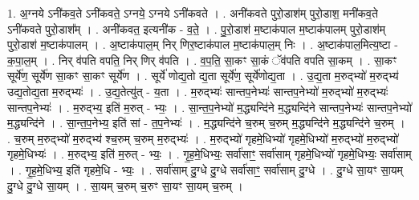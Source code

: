 \documentclass[17pt]{extarticle}
\begin{document}
1. अ॒ग्नये ऽनी॑कव॒ते ऽनी॑कवते॒ ऽग्नये॒ ऽग्नये ऽनी॑कवते । . अनी॑कवते पुरो॒डाश॑म् पुरो॒डाश॒ मनी॑कव॒ते ऽनी॑कवते पुरो॒डाश᳚म् । . अनी॑कवत॒ इत्यनी॑क - व॒ते॒ । . पु॒रो॒डाश॑ म॒ष्टाक॑पाल म॒ष्टाक॑पालम् पुरो॒डाश॑म् पुरो॒डाश॑ म॒ष्टाक॑पालम् । . अ॒ष्टाक॑पाल॒म् निर् णिर॒ष्टाक॑पाल म॒ष्टाक॑पाल॒म् निः । . अ॒ष्टाक॑पाल॒मित्य॒ष्टा - क॒पा॒ल॒म् । . निर् व॑पति वपति॒ निर् णिर् व॑पति । . व॒प॒ति॒ सा॒कꣳ सा॒कं ॅव॑पति वपति सा॒कम् । . सा॒कꣳ सूर्ये॑ण॒ सूर्ये॑ण सा॒कꣳ सा॒कꣳ सूर्ये॑ण । . सूर्ये॑ णोद्य॒तो द्य॒ता सूर्ये॑ण॒ सूर्ये॑णोद्य॒ता । . उ॒द्य॒ता म॒रुद्भ्यो॑ म॒रुद्भ्य॑ उद्य॒तोद्य॒ता म॒रुद्भ्यः॑ । . उ॒द्य॒तेत्यु॑त् - य॒ता । . म॒रुद्भ्यः॑ सान्तप॒नेभ्यः॑ सान्तप॒नेभ्यो॑ म॒रुद्भ्यो॑ म॒रुद्भ्यः॑ सान्तप॒नेभ्यः॑ । . म॒रुद्भ्य॒ इति॑ म॒रुत् - भ्यः॒ । . सा॒न्त॒प॒नेभ्यो॑ म॒द्ध्यन्दि॑ने म॒द्ध्यन्दि॑ने सान्तप॒नेभ्यः॑ सान्तप॒नेभ्यो॑ म॒द्ध्यन्दि॑ने । . सा॒न्त॒प॒नेभ्य॒ इति॑ सां - त॒प॒नेभ्यः॑ । . म॒द्ध्यन्दि॑ने च॒रुम् च॒रुम् म॒द्ध्यन्दि॑ने म॒द्ध्यन्दि॑ने च॒रुम् । . च॒रुम् म॒रुद्भ्यो॑ म॒रुद्भ्य॑ श्च॒रुम् च॒रुम् म॒रुद्भ्यः॑ । . म॒रुद्भ्यो॑ गृहमे॒धिभ्यो॑ गृहमे॒धिभ्यो॑ म॒रुद्भ्यो॑ म॒रुद्भ्यो॑ गृहमे॒धिभ्यः॑ । . म॒रुद्भ्य॒ इति॑ म॒रुत् - भ्यः॒ । . गृ॒ह॒मे॒धिभ्यः॒ सर्वा॑साꣳ॒॒ सर्वा॑साम् गृहमे॒धिभ्यो॑ गृहमे॒धिभ्यः॒ सर्वा॑साम् । . गृ॒ह॒मे॒धिभ्य॒ इति॑ गृहमे॒धि - भ्यः॒ । . सर्वा॑साम् दु॒ग्धे दु॒ग्धे सर्वा॑साꣳ॒॒ सर्वा॑साम् दु॒ग्धे । . दु॒ग्धे सा॒यꣳ सा॒यम् दु॒ग्धे दु॒ग्धे सा॒यम् । . सा॒यम् च॒रुम् च॒रुꣳ सा॒यꣳ सा॒यम् च॒रुम् । \newline
\end{document}
